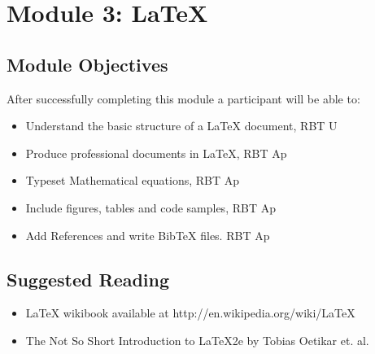 \documentclass{article}
\begin{document}
\section{Module 3: LaTeX}
\label{LaTeX}
\subsection{Module Objectives}
After successfully completing this module a participant will be able to:
	\begin{itemize}
        \item Understand the basic structure of a LaTeX document, \hfill RBT U
	\item Produce professional documents in LaTeX, \hfill RBT Ap
        \item Typeset Mathematical equations, \hfill  RBT Ap
        \item Include figures, tables and code samples, \hfill RBT Ap
        \item Add References and write BibTeX files. \hfill RBT Ap
\end{itemize}
\subsection{Suggested Reading}
\begin{itemize}
    \item LaTeX wikibook available at http://en.wikipedia.org/wiki/LaTeX 
    \item The Not So Short Introduction to LaTeX2e by Tobias Oetikar et. al.
\end{itemize}
\end{document}
